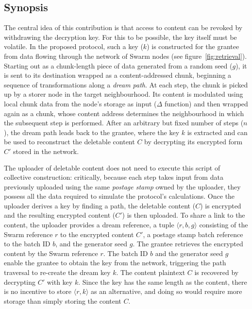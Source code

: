 \documentclass[singlecolumn]{acmart}
\begin{document}
\subsection{Synopsis}

The central idea of this contribution is that access to content can be revoked by withdrawing the decryption key. For this to be possible, the key itself must be volatile. In the proposed protocol, such a key ($k$) is constructed for the grantee from data flowing  through the network of Swarm nodes  (see figure~\ref{fig:retrieval}). Starting out as a chunk-length piece of data generated from a random seed ($g$), it is sent to its destination wrapped as a content-addressed chunk, beginning a sequence of transformations along a \emph{dream path}. At each step, the chunk is picked up by a storer node in the target neighbourhood. Its content is modulated using local chunk data from the node's storage as input ($\Delta$ function) and then wrapped again as a chunk, whose content address determines the neighbourhood in which the subsequent step is performed. After an arbitrary but fixed number of steps ($n$), the dream path leads back to the grantee, where the key $k$ is extracted and can be used to reconstruct the deletable content $C$ by decrypting its encrypted form $C'$ stored in the network. 

The uploader of deletable content does not need to execute this script of collective construction: critically, because each step takes input from data previously uploaded using the same \emph{postage stamp} owned by the uploader, they possess all the data required to simulate the protocol's calculations. Once the uploader derives a key by finding a path, the deletable content ($C$) is encrypted and the resulting encrypted content ($C'$) is then uploaded. To share a link to the content, the uploader provides a dream reference, a tuple $\langle r,b,g\rangle $ consisting of the Swarm reference $r$ to the encrypted content $C'$, a postage stamp batch reference to the batch ID $b$, and the generator seed $g$. The grantee retrieves the encrypted content by the Swarm reference $r$. The batch ID $b$ and the generator seed $g$ enable the grantee to obtain the key from the network, triggering the path traversal to re-create the dream key $k$. The content plaintext $C$ is recovered by decrypting $C'$ with key $k$.  Since the key has the same length as the content, there is no incentive to store $\langle r,k\rangle $ as an alternative, and doing so would require more storage than simply storing the content $C$.
\end{document}
